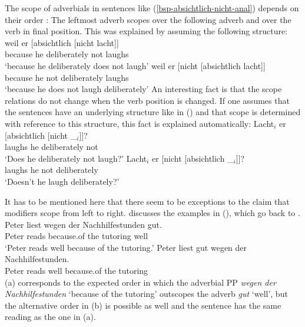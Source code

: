 The scope of adverbials in sentences like (\ref{bsp-absichtlich-nicht-anal}) depends on their order \citep[Section~2.3]{Netter92}:
The leftmost adverb scopes over the following adverb and over the verb in final
position. This was explained by assuming the following structure:
\eal
\label{bsp-absichtlich-nicht-anal}
\ex 
\gll weil er  [absichtlich [nicht lacht]]\\
     because he \hphantom{[}deliberately \hphantom{[}not laughs\\
\glt `because he deliberately does not laugh'
\ex 
\gll weil er [nicht [absichtlich lacht]]\\
     because he \hphantom{[}not \hphantom{[}deliberately laughs\\
\glt `because he does not laugh deliberately'
\zl
An interesting fact is that the scope relations do not change when the verb position is changed. If
one assumes that the sentences have an underlying structure like in () and that scope is
determined with reference to this structure, this fact is explained automatically:
\eal
\label{bsp-absichtlich-nicht-anal-v1}
\ex 
\gll Lacht$_i$ er [absichtlich [nicht \_$_i$]]?\\
     laughs he \hphantom{[}deliberately \hphantom{[}not\\
\glt `Does he deliberately not laugh?'
\ex 
\gll Lacht$_i$ er [nicht [absichtlich \_$_i$]]?\\
     laughs he \hphantom{[}not \hphantom{[}deliberately\\
\glt `Doesn't he laugh deliberately?'
\zl
\nocite{Hoehle88a,Hoehle97a}

\noindent
It has to be mentioned here that there seem to be exceptions to the claim that modifiers scope from
left to right. \citet*[]{Kasper94a} discusses the examples in (), which go back to \citet*[]{BV72}.
\eal
\label{bsp-peter-liest-gut-wegen}
\ex 
\gll Peter liest wegen der Nachhilfestunden gut.\\
     Peter reads because.of the tutoring well\\
\glt `Peter reads well because of the tutoring.'
\ex 
\gll Peter liest gut wegen der Nachhilfestunden.\\
     Peter reads well because.of the tutoring\\
\zl
(a) corresponds to the expected order in which the adverbial PP \emph{wegen der
  Nachhilfestunden} `because of the tutoring' outscopes the adverb \emph{gut} `well', but the alternative order in (b) is
possible as well and the sentence has the same reading as the one in (a).

